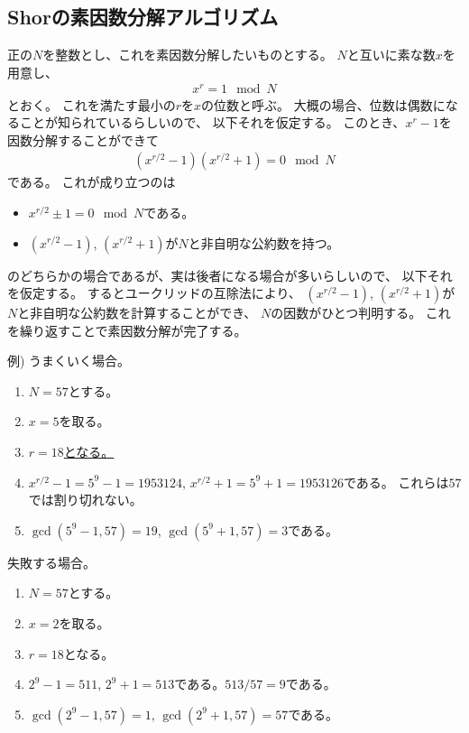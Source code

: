 \documentclass[]{ltjsarticle}
\begin{document}
\subsection{Shorの素因数分解アルゴリズム}
正の$N$を整数とし、これを素因数分解したいものとする。
$N$と互いに素な数$x$を用意し、
\begin{align}
    x^r = 1 \mod N
\end{align}
とおく。
これを満たす最小の$r$を$x$の位数と呼ぶ。
大概の場合、位数は偶数になることが知られているらしいので、
以下それを仮定する。
このとき、$x^r - 1$を因数分解することができて
\begin{align}
    (x^{r/2}-1)(x^{r/2}+1) = 0 \mod N
\end{align}
である。
これが成り立つのは
\begin{itemize}
    \item $x^{r/2}\pm 1 = 0 \mod N$である。
    \item $(x^{r/2}-1)$, $(x^{r/2}+1)$が$N$と非自明な公約数を持つ。
\end{itemize}
のどちらかの場合であるが、実は後者になる場合が多いらしいので、
以下それを仮定する。
するとユークリッドの互除法により、
$(x^{r/2}-1)$, $(x^{r/2}+1)$が$N$と非自明な公約数を計算することができ、
$N$の因数がひとつ判明する。
これを繰り返すことで素因数分解が完了する。

例)
うまくいく場合。
\begin{enumerate}
    \item $N=57$とする。 
    \item $x = 5$を取る。
    \item \href{https://www.wolframalpha.com/input?i=5%5Er+-+1+%3D+0+mod+57&lang=ja}{$r = 18$となる。}
    \item $x^{r/2}-1 = 5^9-1 = 1953124$, $x^{r/2}+1 = 5^9+1 = 1953126$である。
        これらは$57$では割り切れない。
    \item $\gcd(5^9-1, 57) = 19$, $\gcd(5^9+1, 57) = 3$である。
\end{enumerate}

失敗する場合。
\begin{enumerate}
    \item $N=57$とする。 
    \item $x = 2$を取る。
    \item $r = 18$となる。
    \item $2^9-1 = 511$, $2^9+1 = 513$である。$513/57=9$である。
    \item $\gcd(2^9-1, 57) = 1$, $\gcd(2^9+1, 57) = 57$である。
\end{enumerate}
\end{document}
